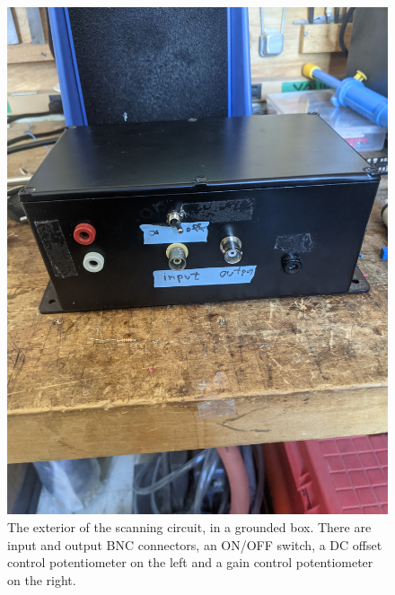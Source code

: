 \documentclass{article}
\begin{document}
\begin{figure}
\centering
\includegraphics[width=\textwidth,angle=-90,origin=c]{Figures/OutsideCircuit.jpg}
\caption{The exterior of the scanning circuit, in a grounded box. There are input and output BNC connectors, an ON/OFF switch, a DC offset control potentiometer on the left and a gain control potentiometer on the right.}
\label{outside}
\end{figure}
\end{document}
